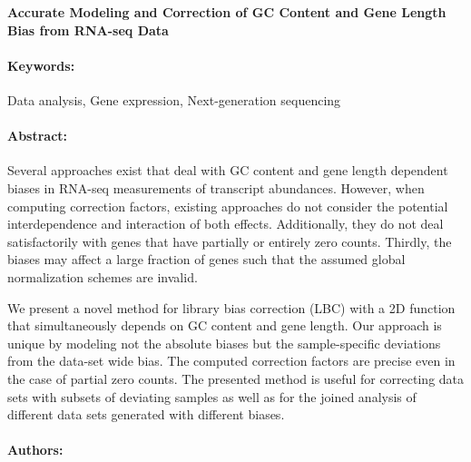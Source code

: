 \noindent
\large {\bf Accurate Modeling and Correction of GC Content and Gene Length Bias from RNA-seq Data} 


\normalsize 


\noindent \paragraph{Keywords:} 
Data analysis, Gene expression, Next-generation sequencing

\noindent \paragraph{Abstract:} 

Several approaches exist that deal with GC content and gene length dependent biases
in RNA-seq measurements of transcript abundances. However, when computing correction factors,
existing approaches do not consider the potential interdependence and interaction of both effects.
Additionally, they do not deal satisfactorily with genes that have partially or entirely zero counts.
Thirdly, the biases may affect a large fraction of genes such that the assumed global normalization
schemes are invalid.

We present a novel method for library bias correction (LBC) with a 2D function that simultaneously depends on GC content and gene length. Our approach is unique by modeling not the 
absolute biases but the sample-specific deviations from the data-set wide bias. The computed correction
factors are precise even in the case of partial zero counts. The presented method is useful for correcting 
data sets with subsets of deviating samples as well as for the joined analysis of different data
sets generated with different biases.

     

\noindent \paragraph{Authors:} 
\paragraph{}

{
\centering
{}
}
